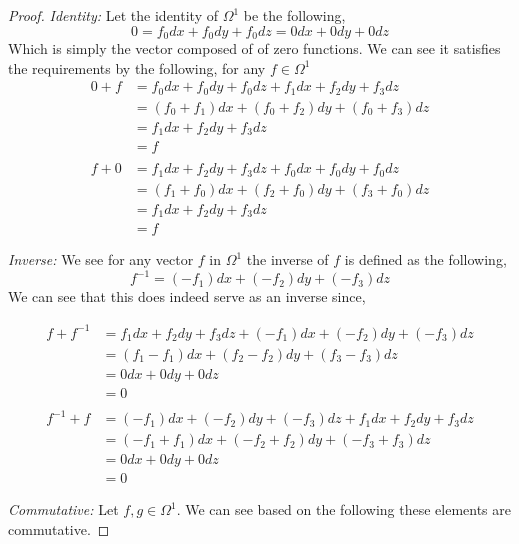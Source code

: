 \documentclass[12pt]{article}
\newcommand {\f}[1]{{#1_1 dx + #1_2 dy + #1_3 dz}}
\begin{document}
\begin{itemize}
\begin{itemize}
\begin{proof}
                \textit{Identity:} Let the identity of $\Omega^1$ be the following,
                \[0 = f_0dx + f_0dy + f_0dz = 0dx + 0dy + 0dz\]
                Which is simply the vector composed of of zero functions. We can see it satisfies the requirements by the following, for any $f\in \Omega^1 $
                \begin{align*}
                    0 + f &= f_0dx + f_0dy + f_0dz + \f{f}  \\
                    &= (f_0 + f_1)dx + (f_0 + f_2)dy + (f_0 + f_3)dz \\
                    &= \f{f}\\
                    &= f\\
                             \\
                    f + 0 &= \f{f} + f_0dx + f_0dy + f_0dz \\
                    &= (f_1 + f_0)dx + (f_2 + f_0)dy + (f_3 + f_0)dz \\ 
                    &= \f{f} \\
                    &= f 
                \end{align*}

                \textit{Inverse:}  We see for any vector $f$ in $\Omega^1$ the inverse of $f$ is defined as the following, \[f^{-1} = (-f_1)dx + (-f_2)dy + (-f_3)dz\]
                We can see that this does indeed serve as an inverse since,

                \begin{align*}
                    f + f^{-1} &= \f{f} + (-f_1)dx +(-f_2)dy + (-f_3)dz \\
                    &= (f_1 - f_1)dx + (f_2 - f_2)dy + (f_3 - f_3)dz \\
                    &= 0dx + 0dy + 0dz \\
                    &= 0 \\
                    \\
                    f^{-1} + f &= (-f_1)dx + (-f_2)dy + (-f_3)dz + \f{f} \\ 
                    &= (-f_1+f_1)dx + (-f_2+f_2)dy + (-f_3+f_3)dz \\ 
                    &= 0dx + 0dy + 0dz \\
                    &= 0 
                \end{align*}

                \textit{Commutative:} Let $f,g\in \Omega^1$. We can see based on the following these elements are commutative.


\end{proof}
\end{itemize}
\end{itemize}
\end{document}
